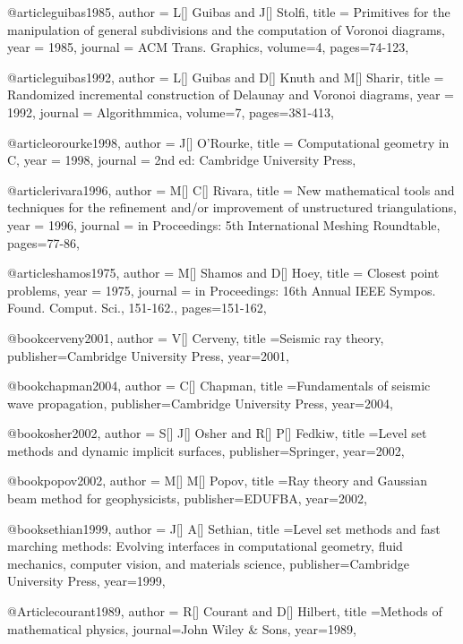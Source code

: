 @article{guibas1985,
  author =	 {L[] Guibas and J[] Stolfi},
  title =	 {Primitives for the manipulation of general subdivisions and the computation of Voronoi diagrams},
  year =	 1985,
  journal =	 {ACM Trans. Graphics},
  volume={4},
 pages=74-123,
}

@article{guibas1992,
  author =	 {L[] Guibas and D[] Knuth and M[] Sharir},
  title =	 {Randomized incremental construction of Delaunay and Voronoi diagrams},
  year =	 1992,
  journal =	 {Algorithmmica},
  volume={7},
 pages=381-413,
}

@article{orourke1998,
  author =	 {J[] O'Rourke},
  title =	 {Computational geometry in C},
  year =	 1998,
  journal =	 {2nd ed: Cambridge University Press},
}

@article{rivara1996,
  author =	 {M[] C[] Rivara},
  title =	 {New mathematical tools and techniques for the refinement and/or improvement of unstructured triangulations},
  year =	 1996,
  journal =	 {in Proceedings: 5th International Meshing Roundtable},
 pages=77-86,
}

@article{shamos1975,
  author =	 {M[] Shamos and D[] Hoey},
  title =	 {Closest point problems},
  year =	 1975,
  journal =	 {in Proceedings: 16th Annual IEEE Sympos. Found. Comput. Sci., 151-162.},
  pages=151-162,
}

@book{cerveny2001,
  author = {V[] Cerveny},
  title ={Seismic ray theory},
  publisher={Cambridge University Press},
  year=2001,
}

@book{chapman2004,
  author = {C[] Chapman},
  title ={Fundamentals of seismic wave propagation},
  publisher={Cambridge University Press},
  year=2004,
}

@book{osher2002,
  author = {S[] J[] Osher and R[] P[] Fedkiw},
  title ={Level set methods and dynamic implicit surfaces},
  publisher={Springer},
  year=2002,
}

@book{popov2002,
  author = {M[] M[] Popov},
  title ={Ray theory and Gaussian beam method for geophysicists},
  publisher={EDUFBA},
  year=2002,
}

@book{sethian1999,
  author = {J[] A[] Sethian},
  title ={Level set methods and fast marching methods: Evolving interfaces in computational geometry, fluid mechanics, computer vision, and materials science},
  publisher={Cambridge University Press},
  year=1999,
}

@Article{courant1989,
  author = {R[] Courant and D[] Hilbert},
  title ={Methods of mathematical physics},
  journal={John Wiley \& Sons},
  year=1989,
}

